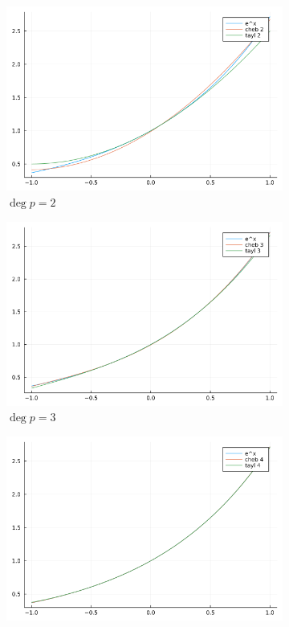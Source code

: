 \documentclass{article}
\newcommand{\1}{\bm 1}
\begin{document}
\begin{figure}[!ht]
    \begin{subfigure}[b]{0.48\textwidth}
        \centering
        \includegraphics[width=\textwidth]{compare-2.png}
        \caption{$\deg p=2$}
    \end{subfigure}
    \hfill
    \begin{subfigure}[b]{0.48\textwidth}
        \centering
        \includegraphics[width=\textwidth]{compare-3.png}
        \caption{$\deg p=3$}
    \end{subfigure}
    \newline
    \begin{subfigure}[b]{0.48\textwidth}
        \centering
        \includegraphics[width=\textwidth]{compare-4.png}

\end{subfigure}
\end{figure}
\end{document}
